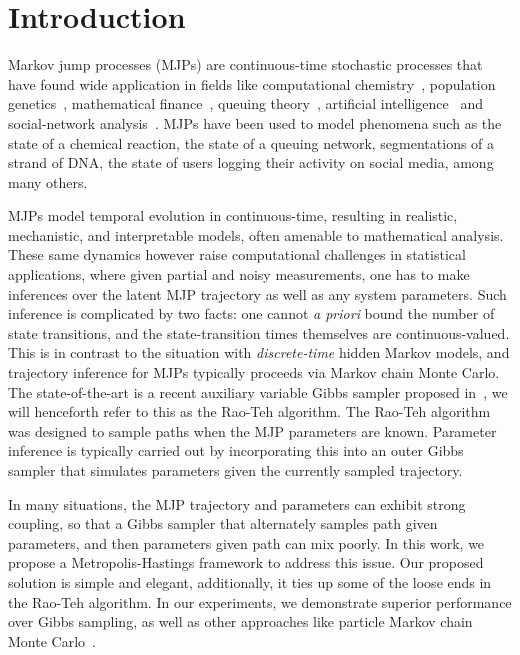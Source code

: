 \section{Introduction}
\label{sec:intro}
Markov jump processes (MJPs) are continuous-time stochastic processes that
have found wide application in fields like computational chemistry~\cite{gillespie97}, 
population genetics~\cite{FearnSher2006}, mathematical finance~\cite{Elliott06}, 
queuing theory~\cite{Breuer2003}, artificial intelligence~\cite{XuShe10} and
social-network analysis~\cite{pan2016markov}. %
MJPs have been used to model phenomena such as the state of a chemical reaction, the state 
of a queuing network, segmentations of a strand of DNA, the state of users 
logging their activity on social media, among many others.

MJPs model temporal evolution in continuous-time, resulting in 
realistic, mechanistic, and interpretable models, often amenable to 
mathematical analysis. These same dynamics however raise computational
challenges in statistical applications, where given partial and noisy 
measurements, one has to make inferences over the latent MJP 
trajectory as well as any system parameters. Such
inference is complicated by two facts: one cannot {\em a priori} 
bound the number of state transitions, and the state-transition times themselves
are continuous-valued. This is in contrast to the situation with
{\em discrete-time} hidden Markov models, and trajectory inference for 
MJPs typically proceeds via Markov chain Monte Carlo. The 
state-of-the-art is a recent auxiliary variable Gibbs sampler proposed 
in~\cite{RaoTeh13}, we will henceforth refer to this as the Rao-Teh algorithm.
The Rao-Teh algorithm was designed to sample paths when the MJP parameters
are known. Parameter inference is typically carried out by 
incorporating this into an outer Gibbs sampler that simulates
parameters given the currently sampled trajectory. 

In many situations, the MJP trajectory and parameters can exhibit 
strong coupling, so that a Gibbs sampler that alternately samples path given
parameters, and then parameters given path can mix poorly.  
In this work, we propose a Metropolis-Hastings framework to address
this issue. Our proposed solution is simple and elegant, additionally,
it ties up some of the loose ends in the Rao-Teh algorithm.
In our experiments, we demonstrate superior 
performance over Gibbs sampling, as well as other approaches like 
particle Markov chain Monte Carlo~\cite{Andrieu10}.


